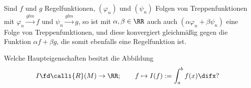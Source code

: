 \begin{antwort}
Sind $f$ und $g$ Regelfunktionen,  
$(\varphi_n)$ und $(\psi_n)$ Folgen von Treppenfunktionen mit 
$\varphi_n \stackrel{glm}{\to}f$ und 
$\psi_n \stackrel{glm}{\to} g$, so ist mit $\alpha,\beta\in \RR$ auch 
auch $(\alpha\varphi_n + \beta\psi_n)$ eine Folge von Treppenfunktionen, und diese 
konvergiert gleichmäßig 
gegen die Funktion $\alpha f+\beta g$, die somit ebenfalls eine 
Regelfunktion ist.
\AntEnd
\end{antwort}


\begin{frage}\label{06_rgei}
Welche Haupteigenschaften besitzt die Abbildung 
\[
I\fd \calli{R}(M) \to \RR; 
\qquad f\mapsto I(f) := \int_a^b f(x) \difx \text{?}
\]
\end{frage}

